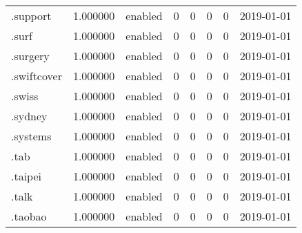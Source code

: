 \begin{tabular}{lrlrrrrl}
.support                  &          1.000000 &         enabled &                           0 &                           0 &                           0 &                   0 &           2019-01-01 \\
.surf                     &          1.000000 &         enabled &                           0 &                           0 &                           0 &                   0 &           2019-01-01 \\
.surgery                  &          1.000000 &         enabled &                           0 &                           0 &                           0 &                   0 &           2019-01-01 \\
.swiftcover               &          1.000000 &         enabled &                           0 &                           0 &                           0 &                   0 &           2019-01-01 \\
.swiss                    &          1.000000 &         enabled &                           0 &                           0 &                           0 &                   0 &           2019-01-01 \\
.sydney                   &          1.000000 &         enabled &                           0 &                           0 &                           0 &                   0 &           2019-01-01 \\
.systems                  &          1.000000 &         enabled &                           0 &                           0 &                           0 &                   0 &           2019-01-01 \\
.tab                      &          1.000000 &         enabled &                           0 &                           0 &                           0 &                   0 &           2019-01-01 \\
.taipei                   &          1.000000 &         enabled &                           0 &                           0 &                           0 &                   0 &           2019-01-01 \\
.talk                     &          1.000000 &         enabled &                           0 &                           0 &                           0 &                   0 &           2019-01-01 \\
.taobao                   &          1.000000 &         enabled &                           0 &                           0 &                           0 &                   0 &           2019-01-01 \\

\end{tabular}
